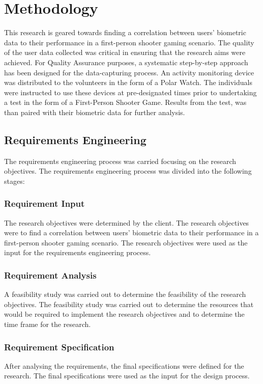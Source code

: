 \chapter{Methodology}

This research is geared towards finding a correlation between users' biometric data to their performance in a first-person shooter gaming scenario. The quality of the user data 
collected was critical in ensuring that the research aims were achieved. For Quality Assurance purposes, a systematic step-by-step approach has been designed for the data-capturing 
process. An activity monitoring device was distributed to the volunteers in the form of a Polar Watch. The individuals were instructed to use these devices at pre-designated times 
prior to undertaking a test in the form of a First-Person Shooter Game. Results from the test, was than paired with their biometric data for further analysis.

\section{Requirements Engineering}
The requirements engineering process was carried focusing on the research objectives. The requirements engineering process was divided into the following stages:

\subsection{Requirement Input}
The research objectives were determined by the client. The research objectives were to find a correlation between users' biometric data to their performance in a
first-person shooter gaming scenario. The research objectives were used as the input for the requirements engineering process.

\subsection{Requirement Analysis}
A feasibility study was carried out to determine the feasibility of the research objectives. The feasibility study was carried out to determine the resources 
that would be required to implement the research objectives and to determine the time frame for the research. 

\subsection{Requirement Specification}
After analysing the requirements, the final specifications were defined for the research. The final specifications were used as the input for the design process.

